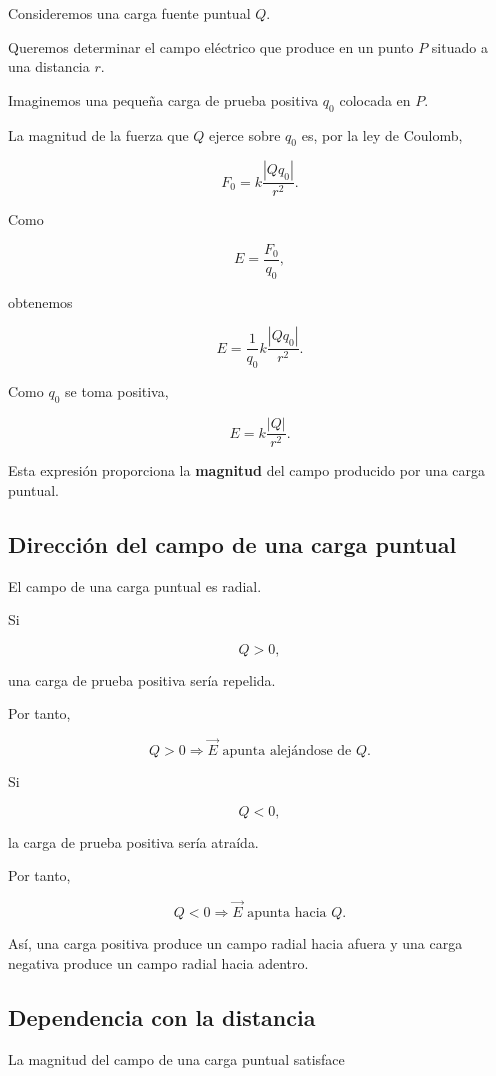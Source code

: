 Consideremos una carga fuente puntual \(Q\).

Queremos determinar el campo eléctrico que produce en un punto \(P\) situado a una
distancia \(r\).

Imaginemos una pequeña carga de prueba positiva \(q_0\) colocada en \(P\).

La magnitud de la fuerza que \(Q\) ejerce sobre \(q_0\) es, por la ley de Coulomb,

\[
F_0=k\frac{|Qq_0|}{r^2}.
\]

Como

\[
E=\frac{F_0}{q_0},
\]

obtenemos

\[
E=\frac{1}{q_0}k\frac{|Qq_0|}{r^2}.
\]

Como \(q_0\) se toma positiva,

\[
\boxed{E=k\frac{|Q|}{r^2}}.
\label{eq:campo_carga_puntual_magnitud}
\]

Esta expresión proporciona la \textbf{magnitud} del campo producido por una carga
puntual.


\subsection{Dirección del campo de una carga puntual}

El campo de una carga puntual es radial.

Si

\[
Q>0,
\]

una carga de prueba positiva sería repelida.

Por tanto,

\[
\boxed{Q>0\Longrightarrow\vec E\text{ apunta alejándose de }Q}.
\]

Si

\[
Q<0,
\]

la carga de prueba positiva sería atraída.

Por tanto,

\[
\boxed{Q<0\Longrightarrow\vec E\text{ apunta hacia }Q}.
\]

Así, una carga positiva produce un campo radial hacia afuera y una carga negativa
produce un campo radial hacia adentro.


\subsection{Dependencia con la distancia}

La magnitud del campo de una carga puntual satisface

